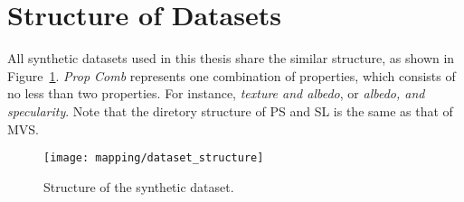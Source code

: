 \section{Structure of Datasets}
All synthetic datasets used in this thesis share the similar structure, as shown in Figure~\ref{fig:dataset_structure}. \textit{Prop Comb} represents one combination of properties, which consists of no less than two properties. For instance, \textit{texture and albedo}, or \textit{albedo, and specularity}. Note that the diretory structure of PS and SL is the same as that of MVS.
\begin{figure}[!htbp]
\centering
\texttt{[image: mapping/dataset\_structure]}
\caption{Structure of the synthetic dataset.}
\label{fig:dataset_structure}
\end{figure}


